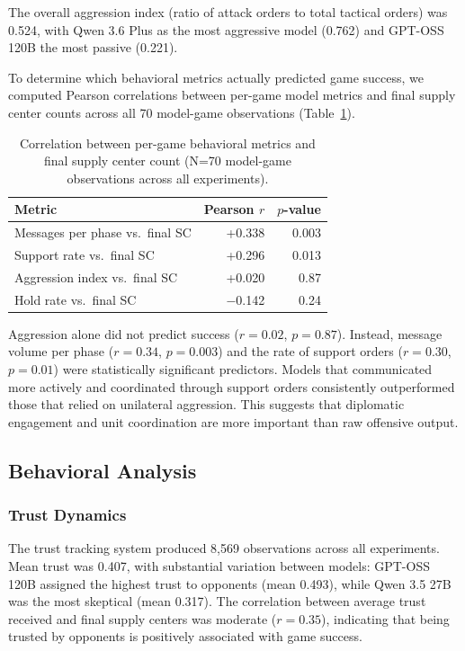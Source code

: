 \documentclass[a4paper,oneside,bibliography=totoc]{scrartcl}
\begin{document}
The overall aggression index (ratio of attack orders to total tactical orders) was 0.524, with Qwen 3.6 Plus as the most aggressive model (0.762) and GPT-OSS 120B the most passive (0.221).

To determine which behavioral metrics actually predicted game success, we computed Pearson correlations between per-game model metrics and final supply center counts across all 70 model-game observations (Table~\ref{tab:correlations}).

\begin{table}[h]
\centering
\begin{tabular}{lrr}
  \toprule
  Metric & Pearson $r$ & $p$-value \\
  \midrule
  Messages per phase vs.\ final SC & +0.338 & 0.003 \\
  Support rate vs.\ final SC & +0.296 & 0.013 \\
  Aggression index vs.\ final SC & +0.020 & 0.87 \\
  Hold rate vs.\ final SC & $-$0.142 & 0.24 \\
  \bottomrule
\end{tabular}
\caption{Correlation between per-game behavioral metrics and final supply center count (N=70 model-game observations across all experiments).}
\label{tab:correlations}
\end{table}

Aggression alone did not predict success ($r = 0.02$, $p = 0.87$). Instead, message volume per phase ($r = 0.34$, $p = 0.003$) and the rate of support orders ($r = 0.30$, $p = 0.01$) were statistically significant predictors. Models that communicated more actively and coordinated through support orders consistently outperformed those that relied on unilateral aggression. This suggests that diplomatic engagement and unit coordination are more important than raw offensive output.

\subsection{Behavioral Analysis}

\subsubsection{Trust Dynamics}

The trust tracking system produced 8,569 observations across all experiments. Mean trust was 0.407, with substantial variation between models: GPT-OSS 120B assigned the highest trust to opponents (mean 0.493), while Qwen 3.5 27B was the most skeptical (mean 0.317). The correlation between average trust received and final supply centers was moderate ($r = 0.35$), indicating that being trusted by opponents is positively associated with game success.
\end{document}
